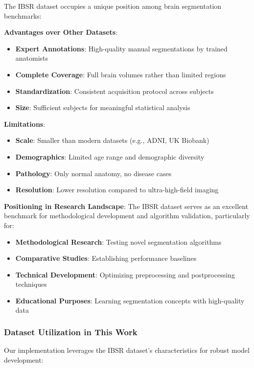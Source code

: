 \documentclass[12pt,a4paper]{article}
\begin{document}
The IBSR dataset occupies a unique position among brain segmentation benchmarks:

\textbf{Advantages over Other Datasets}:
\begin{itemize}
    \item \textbf{Expert Annotations}: High-quality manual segmentations by trained anatomists
    \item \textbf{Complete Coverage}: Full brain volumes rather than limited regions
    \item \textbf{Standardization}: Consistent acquisition protocol across subjects
    \item \textbf{Size}: Sufficient subjects for meaningful statistical analysis
\end{itemize}

\textbf{Limitations}:
\begin{itemize}
    \item \textbf{Scale}: Smaller than modern datasets (e.g., ADNI, UK Biobank)
    \item \textbf{Demographics}: Limited age range and demographic diversity
    \item \textbf{Pathology}: Only normal anatomy, no disease cases
    \item \textbf{Resolution}: Lower resolution compared to ultra-high-field imaging
\end{itemize}

\textbf{Positioning in Research Landscape}:
The IBSR dataset serves as an excellent benchmark for methodological development and algorithm validation, particularly for:
\begin{itemize}
    \item \textbf{Methodological Research}: Testing novel segmentation algorithms
    \item \textbf{Comparative Studies}: Establishing performance baselines
    \item \textbf{Technical Development}: Optimizing preprocessing and postprocessing techniques
    \item \textbf{Educational Purposes}: Learning segmentation concepts with high-quality data
\end{itemize}

\subsubsection{Dataset Utilization in This Work}

Our implementation leverages the IBSR dataset's characteristics for robust model development:
\end{document}
